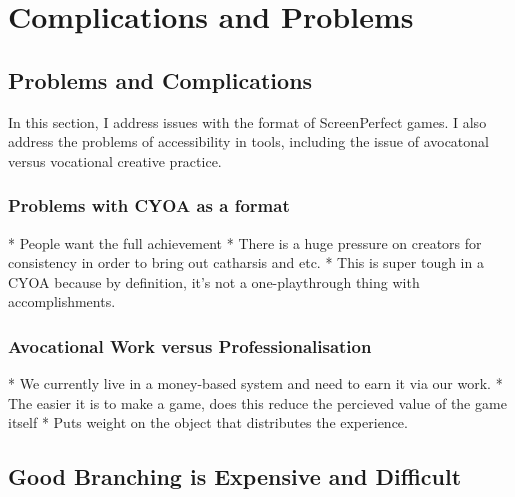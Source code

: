 
\chapter{Complications and Problems} %

\label{Chapter5} %



\section{Problems and Complications}

In this section, I address issues with the format of ScreenPerfect games. I also address the problems of accessibility in tools, including the issue of avocatonal versus vocational creative practice.

\subsection{Problems with CYOA as a format}

* People want the full achievement
* There is a huge pressure on creators for consistency in order to bring out catharsis and etc.
* This is super tough in a CYOA because by definition, it's not a one-playthrough thing with accomplishments.


\subsection{Avocational Work versus Professionalisation}

* We currently live in a money-based system and need to earn it via our work.
* The easier it is to make a game, does this reduce the percieved value of the game itself
* Puts weight on the object that distributes the experience.


\section{Good Branching is Expensive and Difficult}
